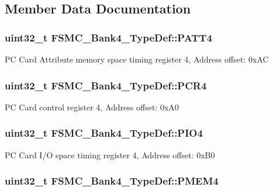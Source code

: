 \subsection{Member Data Documentation}
\hypertarget{struct_f_s_m_c___bank4___type_def_a4cccc7802b573135311cc38e7f247ff5}{
\subsubsection[{P\-A\-T\-T4}]{ uint32\-\_\-t F\-S\-M\-C\-\_\-\-Bank4\-\_\-\-Type\-Def\-::\-P\-A\-T\-T4}}\label{struct_f_s_m_c___bank4___type_def_a4cccc7802b573135311cc38e7f247ff5}
P\-C Card Attribute memory space timing register 4, Address offset\-: 0x\-A\-C \hypertarget{struct_f_s_m_c___bank4___type_def_a0470b5bbb53e9f1bbde09829371eb72f}{
\subsubsection[{P\-C\-R4}]{ uint32\-\_\-t F\-S\-M\-C\-\_\-\-Bank4\-\_\-\-Type\-Def\-::\-P\-C\-R4}}\label{struct_f_s_m_c___bank4___type_def_a0470b5bbb53e9f1bbde09829371eb72f}
P\-C Card control register 4, Address offset\-: 0x\-A0 \hypertarget{struct_f_s_m_c___bank4___type_def_a531ebc38c47bebfb198eafb4de24cb2a}{
\subsubsection[{P\-I\-O4}]{ uint32\-\_\-t F\-S\-M\-C\-\_\-\-Bank4\-\_\-\-Type\-Def\-::\-P\-I\-O4}}\label{struct_f_s_m_c___bank4___type_def_a531ebc38c47bebfb198eafb4de24cb2a}
P\-C Card I/\-O space timing register 4, Address offset\-: 0x\-B0 \hypertarget{struct_f_s_m_c___bank4___type_def_a4ed4ce751e7a8b3207bd20675b1d9085}{
\subsubsection[{P\-M\-E\-M4}]{ uint32\-\_\-t F\-S\-M\-C\-\_\-\-Bank4\-\_\-\-Type\-Def\-::\-P\-M\-E\-M4}}\label{struct_f_s_m_c___bank4___type_def_a4ed4ce751e7a8b3207bd20675b1d9085}
